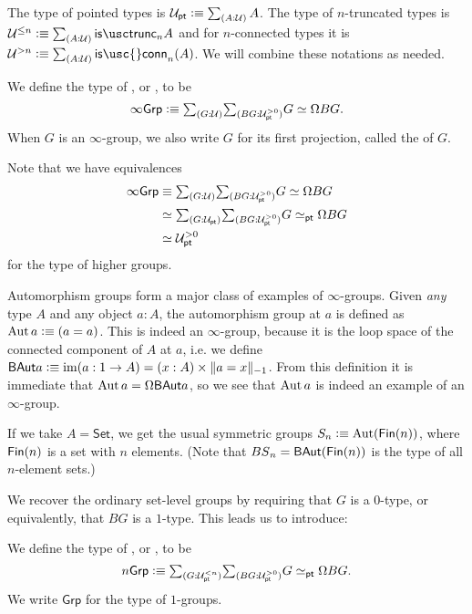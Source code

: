 The type of pointed types is
$\UU_\pt \defeq  \sm{A:\UU} A$. The type of $n$-truncated types is
$\UU^{\le n} \defeq  \sm{A:\UU}\istrunc{n}{A}$ and for $n$-connected types it is
$\UU^{>n} \defeq  \sm{A:\UU}\mathsf{is\usc{}conn}_n(A)$. We will combine these notations as needed.

\begin{defn}
We define the type of , or , to be
\begin{equation*}
\infty\mathsf{Grp}\defeq \sm{G:\UU}{BG:\UU_\pt^{>0}} \eqv{G}{\loopspacesym BG}.
\end{equation*}
When $G$ is an $\infty$-group, we also write $G$ for its first projection, called the  of $G$.
\end{defn}

\begin{rmk}
Note that we have equivalences
\begin{align*}
  \infty\mathsf{Grp}
  &\jdeq   \sm{G:\UU}{BG:\UU_\pt^{>0}} \eqv{G}{\loopspacesym BG} \\
  &\eqvsym \sm{G:\UU_\pt}{BG:\UU_\pt^{>0}} G \eqvsym_\pt \loopspacesym BG \\
  &\eqvsym \UU_\pt^{>0}
\end{align*}
for the type of higher groups. 
\end{rmk}

Automorphism groups form a major class of examples of $\infty$-groups.
Given \emph{any} type $A$ and any object $a : A$, the automorphism group at $a$ is defined as
 $\Aut a\defeq (a=a)$. 
This is indeed an $\infty$-group, because it is the loop space of the connected component of $A$ at $a$, i.e. we define~$\BAut a \defeq  \im(a : 1 \to A) = (x : A) \times \trunc{-1}{a=x}$.
From this definition it is immediate that $\Aut a=\loopspacesym\BAut a$, so we see that $\Aut a$ is indeed an example of an $\infty$-group. 

If we take $A = \mathsf{Set}$, we get the usual symmetric groups
$\Sym_n \defeq  \Aut(\Fin(n))$, where $\Fin(n)$ is a set with $n$
elements. (Note that $\BS_n = \BAut(\Fin (n))$ is the type of all
$n$-element sets.)

We recover the ordinary set-level groups by requiring that $G$ is a $0$-type, or equivalently, that $BG$
is a $1$-type. This leads us to introduce:

\begin{defn}
We define the type of , or , to be
\begin{equation*}
n\mathsf{Grp} \defeq \sm{G:\UU_\pt^{<n}}{BG :\UU_\pt^{>0}} G \eqvsym_\pt \loopspacesym BG.
\end{equation*}
We write $\mathsf{Grp}$ for the type of $1$-groups.
\end{defn}

